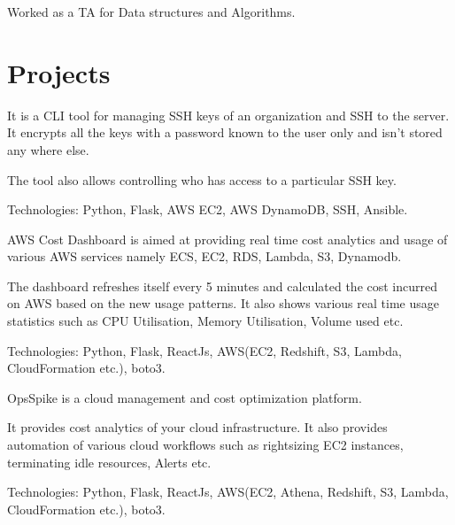 \documentclass[]{deedy-resume-reversed}
\begin{document}
\begin{minipage}[t]{0.60\textwidth}
\begin{tightemize}
\item Worked as a TA for Data structures and Algorithms.
\end{tightemize}
\sectionsep


\section{Projects}
\begin{tightemize}
\item It is a CLI tool for managing SSH keys of an organization and SSH to the server. It encrypts all the keys with a password known to the user only and isn't stored any where else.
\item The tool also allows controlling who has access to a particular SSH key.
\item Technologies: Python, Flask, AWS EC2, AWS DynamoDB, SSH, Ansible.
\end{tightemize}
\sectionsep

\begin{tightemize}
\item AWS Cost Dashboard is aimed at providing real time cost analytics and usage of various AWS services namely ECS, EC2, RDS, Lambda, S3, Dynamodb.
\item The dashboard refreshes itself every 5 minutes and calculated the cost incurred on AWS based on the new usage patterns. It also shows various real time usage statistics such as CPU Utilisation, Memory Utilisation, Volume used etc.
\item Technologies: Python, Flask, ReactJs, AWS(EC2, Redshift, S3, Lambda, CloudFormation etc.), boto3.
\end{tightemize}
\sectionsep

\begin{tightemize}
\item OpsSpike is a cloud management and cost optimization platform.
\item It provides cost analytics of your cloud infrastructure. It also provides automation of various cloud workflows such as rightsizing EC2 instances, terminating idle resources, Alerts etc.
\item Technologies: Python, Flask, ReactJs, AWS(EC2, Athena, Redshift, S3, Lambda, CloudFormation etc.), boto3.
\end{tightemize}
\sectionsep


\end{minipage}
\end{document}
